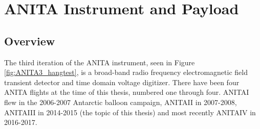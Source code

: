 
\chapter{ANITA Instrument and Payload}
\section{Overview}
	The third iteration of the ANITA instrument, seen in Figure \ref{fig:ANITA3_hangtest}, is a broad-band radio frequency electromagnetic field transient detector and time domain voltage digitizer.  There have been four ANITA flights at the time of this thesis, numbered one through four.  ANITAI flew in the 2006-2007 Antarctic balloon campaign\cite{ANITA1}, ANITAII in 2007-2008\cite{ANITA2}, ANITAIII in 2014-2015 (the topic of this thesis) and most recently ANITAIV in 2016-2017.
	
